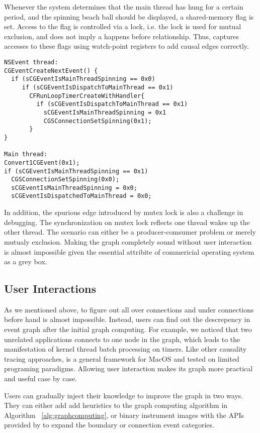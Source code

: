 Whenever the system determines that the main thread has hung for a certain
period, and the spinning beach ball should be displayed, a shared-memory flag
is set. Access to the flag is controlled via a lock, i.e. the lock is used for
mutual exclusion, and does not imply a happens before relationship. Thus, \xxx
captures accesses to these flags using watch-point registers to add causal edges
correctly.

{\footnotesize \begin{verbatim}
NSEvent thread:
CGEventCreateNextEvent() {
  if (sCGEventIsMainThreadSpinning == 0x0)
     if (sCGEventIsDispatchToMainThread == 0x1)
       CFRunLoopTimerCreateWithHandler{
         if (sCGEventIsDispatchToMainThread == 0x1)
           sCGEventIsMainThreadSpinning = 0x1
           CGSConnectionSetSpinning(0x1);
       }
}

Main thread:
Convert1CGEvent(0x1);
if (sCGEventIsMainThreadSpinning == 0x1)
  CGSConnectionSetSpinning(0x0);
  sCGEventIsMainThreadSpinning = 0x0;
  sCGEventIsDispatchedToMainThread = 0x0;
\end{verbatim}
}

In addition, the spurious edge introduced by mutex lock is also a challenge in
debugging. The synchronization on mutex lock reflects one thread wakes up the
other thread. The scenario can either be a producer-comsumer problem or merely
mutualy exclusion. Making the graph completely sound without user interaction is
almost impossible given the essential attribite of commericial operating system
as a grey box.

\subsection{User Interactions}


As we mentioned above, to figure out all over connections and under
connections before hand is almost impossible. Instead, users can find out the
descrepency in event graph after the initial graph computing. For
example, we noticed that two unrelated applications connects to one node in the
graph, which leads to the manifestation of kernel thread batch processing on
timers.  Like other causality tracing approaches, \xxx is a general
framework for MacOS and tested on limited programing paradigms. Allowing user interaction makes
its graph more practical and useful case by case.

Users can gradually inject their knowledge to improve the graph
in two ways. They can either add add heuristics to the
graph computing algorithm in Algorithm ~\ref{alg:graphcomputing}, or binary instrument
images with the APIs provided by \xxx to expand the boundary or connection event categories.
